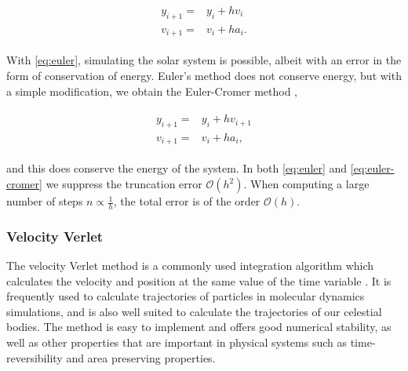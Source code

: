\documentclass[../main.tex]{subfiles}
\begin{document}
\begin{align}
    \begin{split}
        y_{i+1} = & y_i + h v_i\\
        v_{i+1} = & v_i + h a_i.
    \end{split}
    \label{eq:euler}
\end{align}

With \cref{eq:euler}, simulating the solar system is possible, albeit with an error in the form of conservation of energy. Euler's method does not conserve energy, but with a simple modification, we obtain the Euler-Cromer method \cite{VeselyFranzJ1994Cp:a},

\begin{align}
    \begin{split}
        y_{i+1} = & y_i + h v_{i+1}\\
        v_{i+1} = & v_i + h a_i,
    \end{split}
    \label{eq:euler-cromer}
\end{align}

and this does conserve the energy of the system. In both \cref{eq:euler} and \cref{eq:euler-cromer} we suppress the truncation error $\mathcal{O}(h^2)$. When computing a large number of steps $n \propto \frac{1}{h}$, the total error is of the order $\mathcal{O}(h)$.

\iffalse
The forward Euler method can be represented by the recursive relation

\begin{align}
    y_{i+1}=y_i+hf(t_i,y_i)+\mathcal{O}(h^2).
\end{align} We see that the next element of the function \ensuremath{y(t)} is given explicitly by the previous element.  
\fi

\iffalse
\begin{algorithm}[H]
\SetAlgoLined
 
 \caption{Forward Euler}
\end{algorithm}
\fi

\subsubsection{Velocity Verlet}
The velocity Verlet method is a commonly used integration algorithm which calculates the velocity and position at the same value of the time variable \cite{Verlet1967}. It  is  frequently  used  to  calculate  trajectories  of  particles  in  molecular  dynamics  simulations, and is also well suited to calculate the trajectories of our celestial bodies.  The method is easy to implement and offers good numerical stability, as well as other properties that are important in physical systems such as time-reversibility and area preserving properties. 
\end{document}
